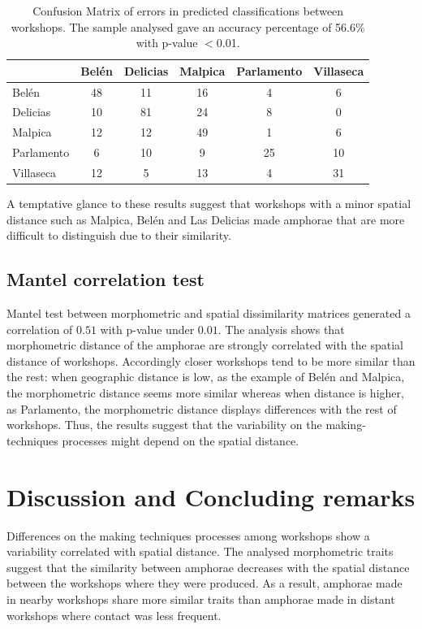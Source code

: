 \documentclass[review]{elsarticle}
\begin{document}
\begin{table}[htp]
\begin{tabular}{lccccc}
\hline
      & Belén & Delicias & Malpica & Parlamento & Villaseca\\ \hline
Belén & 48 & 11 & 16 & 4 & 6 \\
Delicias & 10 & 81 & 24 & 8 & 0 \\
Malpica & 12 & 12 & 49 & 1 & 6 \\
Parlamento & 6 & 10 & 9 & 25 & 10 \\
Villaseca & 12 & 5 & 13 & 4 & 31 \\
\hline

\end{tabular}
\caption{Confusion Matrix of errors in predicted classifications between workshops. The sample analysed gave an accuracy percentage of 56.6\% with p-value $<$0.01. }
\label{table:confusion}
\end{table}

A temptative glance to these results suggest that workshops with a minor spatial distance such as Malpica, Belén and Las Delicias made amphorae that are more difficult to distinguish due to their similarity. 

\subsection{Mantel correlation test}

Mantel test between morphometric and spatial dissimilarity matrices generated a correlation of $0.51$ with p-value under $0.01$. The analysis shows that morphometric distance of the amphorae are strongly correlated with the spatial distance of workshops. Accordingly closer workshops tend to be more similar than the rest: when geographic distance is low, as the example of Belén and Malpica, the morphometric distance seems more similar whereas when distance is higher, as Parlamento, the morphometric distance displays differences with the rest of workshops. Thus, the results suggest that the variability on the making-techniques processes might depend on the spatial distance.   

\section{Discussion and Concluding remarks}

Differences on the making techniques processes among workshops show a variability correlated with spatial distance. The analysed morphometric traits suggest that the similarity between amphorae decreases with the spatial distance between the workshops where they were produced. As a result, amphorae made in nearby workshops share more similar traits than amphorae made in distant workshops where contact was less frequent.
\end{document}
